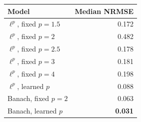 \begin{tabular}{lr}
\toprule
Model & Median NRMSE \\
\midrule
$\ell^p$, fixed $p=1.5$ & 0.172 \\
$\ell^p$, fixed $p=2$ & 0.482 \\
$\ell^p$, fixed $p=2.5$ & 0.178 \\
$\ell^p$, fixed $p=3$ & 0.181 \\
$\ell^p$, fixed $p=4$ & 0.198 \\
$\ell^p$, learned $p$ & 0.088 \\
Banach, fixed $p=2$ & 0.063 \\
Banach, learned $p$ & \textbf{0.031} \\
\bottomrule
\end{tabular}
